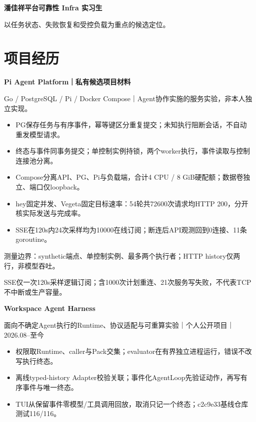 \documentclass[10pt,a4paper,UTF8,fontset=fandol]{ctexart}
\begin{document}
\fontsize{9.5}{12.0}\selectfont
{\fontsize{23.5}{26}\selectfont\bfseries 潘佳祥}\hfill {\color{navy}\bfseries 平台可靠性 Infra 实习生}
\par{}
\par{}
\par\vspace{0.3em}以任务状态、失败恢复和受控负载为重点的候选定位。
\section{项目经历}
{\bfseries\color{navy}Pi Agent Platform｜私有候选项目材料}\par
{\color{muted}\fontsize{8.8}{10.8}\selectfont Go / PostgreSQL / Pi / Docker Compose｜Agent协作实施的服务实验，非本人独立实现。}\par
\begin{itemize}
\item PG保存任务与有序事件，幂等键区分重复提交；未知执行阻断会话，不自动重发模型请求。
\item 终态与事件同事务提交；单控制实例持锁，两个worker执行，事件读取与控制连接池分离。
\item Compose分离API、PG、Pi与负载端，合计4 CPU / 8 GiB硬配额；数据卷独立、端口仅loopback。
\item hey固定并发、Vegeta固定目标速率：54轮共72600次请求均HTTP 200，分开核实际发送与完成率。
\item SSE在120s内24次采样均为10000在线订阅；断连后API观测回到0连接、11条goroutine。
\end{itemize}
{\color{muted}\fontsize{8.5}{10.4}\selectfont 测量边界：synthetic端点、单控制实例、最多两个执行者；HTTP history仅两行，非模型吞吐。\par}
{\color{muted}\fontsize{8.5}{10.4}\selectfont SSE仅一次120s采样逻辑订阅；含1000次计划重连、21次服务写失败，不代表TCP不中断或生产容量。\par}
\vspace{0.6em}
{\bfseries\color{navy}Workspace Agent Harness}\par
{\color{muted}\fontsize{8.8}{10.8}\selectfont 面向不确定Agent执行的Runtime、协议适配与可重算实验｜个人公开项目｜2026.08--至今}\par
\begin{itemize}
\item 权限取Runtime、caller与Pack交集；evaluator在有界独立进程运行，错误不改写执行终态。
\item 离线typed-history Adapter校验关联；事件化AgentLoop先验证动作，再写有序事件与唯一终态。
\item TUI从保留事件零模型/工具调用回放，取消只记一个终态；c2c9e33基线仓库测试116/116。
\end{itemize}
\end{document}
